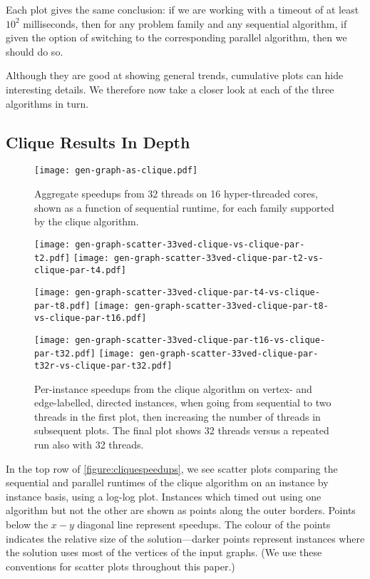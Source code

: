 \documentclass[sigconf]{acmart}
\begin{document}
Each plot gives the same conclusion: if we are working with a timeout of at least $10^2$
milliseconds, then for any problem family and any sequential algorithm, if given the option of
switching to the corresponding parallel algorithm, then we should do so.

Although they are good at showing general trends, cumulative plots can hide interesting details. We
therefore now take a closer look at each of the three algorithms in turn.

\subsection{Clique Results In Depth}

\begin{figure}[p]
    \texttt{[image: gen-graph-as-clique.pdf]}

    \caption{Aggregate speedups from 32 threads on 16 hyper-threaded cores, shown as a function of
    sequential runtime, for each family supported by the clique algorithm.}\label{figure:cliqueas}
\end{figure}
\begin{figure}[p]
    \texttt{[image: gen-graph-scatter-33ved-clique-vs-clique-par-t2.pdf]}
    \hfill
    \texttt{[image: gen-graph-scatter-33ved-clique-par-t2-vs-clique-par-t4.pdf]}

    \vspace*{1em}

    \texttt{[image: gen-graph-scatter-33ved-clique-par-t4-vs-clique-par-t8.pdf]}
    \hfill
    \texttt{[image: gen-graph-scatter-33ved-clique-par-t8-vs-clique-par-t16.pdf]}

    \vspace*{1em}

    \texttt{[image: gen-graph-scatter-33ved-clique-par-t16-vs-clique-par-t32.pdf]}
    \hfill
    \texttt{[image: gen-graph-scatter-33ved-clique-par-t32r-vs-clique-par-t32.pdf]}

    \caption{Per-instance speedups from the clique algorithm on vertex- and edge-labelled, directed
    instances, when going from sequential to two threads in the first plot, then increasing the
    number of threads in subsequent plots. The final plot shows 32 threads versus a repeated run
    also with 32 threads.}\label{figure:cliquescale}
\end{figure}

In the top row of \cref{figure:cliquespeedups}, we see scatter plots comparing the sequential and
parallel runtimes of the clique algorithm on an instance by instance basis, using a log-log plot.
Instances which timed out using one algorithm but not the other are shown as points along the outer
borders. Points below the $x{-}y$ diagonal line represent speedups. The colour of the points indicates
the relative size of the solution---darker points represent instances where the solution uses most
of the vertices of the input graphs. (We use these conventions for scatter plots throughout this
paper.)
\end{document}
